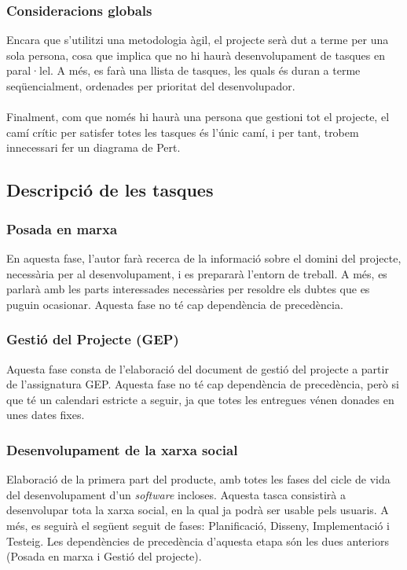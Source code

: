 \documentclass[11pt,catalan,listoffigures,listoftables]{tfgetsinf}
\begin{document}
\subsubsection{Consideracions globals}

Encara que s'utilitzi una metodologia àgil, el projecte serà dut a terme per una sola persona, cosa que implica que no hi haurà desenvolupament de tasques en paral·lel. A més, es farà una llista de tasques, les quals és duran a terme seqüencialment, ordenades per prioritat del desenvolupador.\\ \\
Finalment, com que només hi haurà una persona que gestioni tot el projecte, el camí crític per satisfer totes les tasques és l’únic camí,  i per tant, trobem innecessari fer un diagrama de Pert.

\subsection{Descripció de les tasques}

\subsubsection{Posada en marxa}
En aquesta fase, l’autor farà recerca de la informació sobre el domini del projecte, necessària per al desenvolupament, i es prepararà l’entorn de treball. A més, es parlarà amb les parts interessades necessàries per resoldre els dubtes que es puguin ocasionar. Aquesta fase no té cap dependència de precedència.
	
\subsubsection{Gestió del Projecte (GEP)}
Aquesta fase consta de l’elaboració del document de gestió del projecte a partir de l’assignatura GEP. Aquesta fase no té cap dependència de precedència, però si que té un calendari estricte a seguir, ja que totes les entregues vénen donades en unes dates fixes.

\subsubsection{Desenvolupament de la xarxa social}
Elaboració de la primera part del producte, amb totes les fases del cicle de vida del desenvolupament d’un \textit{software} incloses.  Aquesta tasca consistirà a desenvolupar tota la xarxa social, en la qual ja podrà ser usable pels usuaris. A més, es seguirà el següent seguit de fases: Planificació, Disseny, Implementació i Testeig. Les dependències de precedència d’aquesta etapa són les dues anteriors (Posada en marxa i Gestió del projecte).
\end{document}

